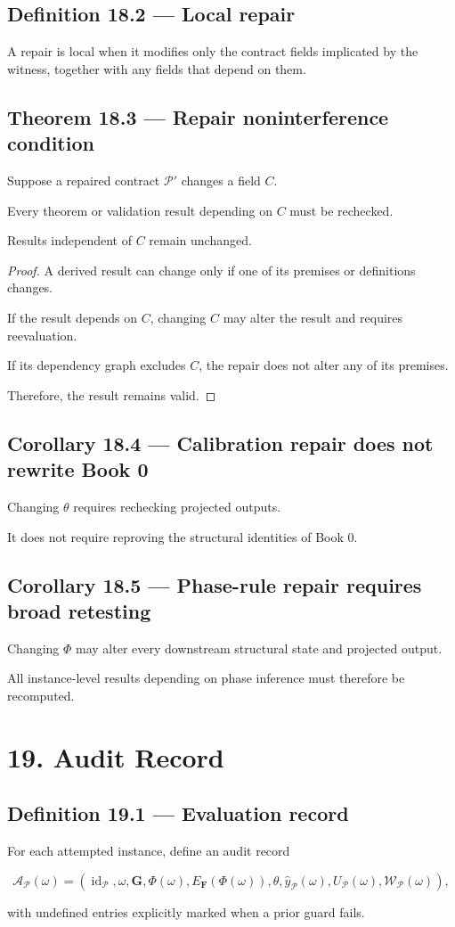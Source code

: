 \documentclass[11pt,oneside,openany]{book}
\newcommand{\PCsection}[1]{%
  \section*{#1}\addcontentsline{toc}{section}{#1}%
}
\newcommand{\PCsubsection}[1]{%
  \subsection*{#1}%
}
\begin{document}
\PCsubsection{Definition 18.2 --- Local repair}

A repair is local when it modifies only the contract fields implicated by the witness, together with any fields that depend on them.

\PCsubsection{Theorem 18.3 --- Repair noninterference condition}

Suppose a repaired contract \(\mathcal P'\) changes a field \(C\).

Every theorem or validation result depending on \(C\) must be rechecked.

Results independent of \(C\) remain unchanged.

\begin{proof}
A derived result can change only if one of its premises or definitions changes.

If the result depends on \(C\), changing \(C\) may alter the result and requires reevaluation.

If its dependency graph excludes \(C\), the repair does not alter any of its premises.

Therefore, the result remains valid.

\end{proof}

\PCsubsection{Corollary 18.4 --- Calibration repair does not rewrite Book 0}

Changing \(\theta\) requires rechecking projected outputs.

It does not require reproving the structural identities of Book 0.

\PCsubsection{Corollary 18.5 --- Phase-rule repair requires broad retesting}

Changing \(\Phi\) may alter every downstream structural state and projected output.

All instance-level results depending on phase inference must therefore be recomputed.


\PCsection{19. Audit Record}

\PCsubsection{Definition 19.1 --- Evaluation record}

For each attempted instance, define an audit record

\[
\boxed{ \mathcal A_{\mathcal P}(\omega) = \left( \operatorname{id}_{\mathcal P}, \omega, \mathbf G, \Phi(\omega), E_{\mathbf F}(\Phi(\omega)), \theta, \widehat y_{\mathcal P}(\omega), U_{\mathcal P}(\omega), \mathcal W_{\mathcal P}(\omega) \right), }
\]

with undefined entries explicitly marked when a prior guard fails.
\end{document}
